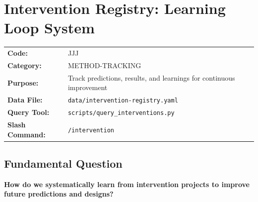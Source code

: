 
\chapter{Intervention Registry: Learning Loop System}
\label{app:intervention-registry}

\begin{tcolorbox}[colback=gray!5, colframe=gray!50, title=Appendix Metadata]
\begin{tabular}{ll}
\textbf{Code:} & JJJ \\
\textbf{Category:} & METHOD-TRACKING \\
\textbf{Purpose:} & Track predictions, results, and learnings for continuous improvement \\
\textbf{Data File:} & \texttt{data/intervention-registry.yaml} \\
\textbf{Query Tool:} & \texttt{scripts/query\_interventions.py} \\
\textbf{Slash Command:} & \texttt{/intervention} \\
\end{tabular}
\end{tcolorbox}

\section{Fundamental Question}

\begin{tcolorbox}[colback=blue!5, colframe=blue!50, title=Central Question]
\textbf{How do we systematically learn from intervention projects to improve future predictions and designs?}
\end{tcolorbox}

